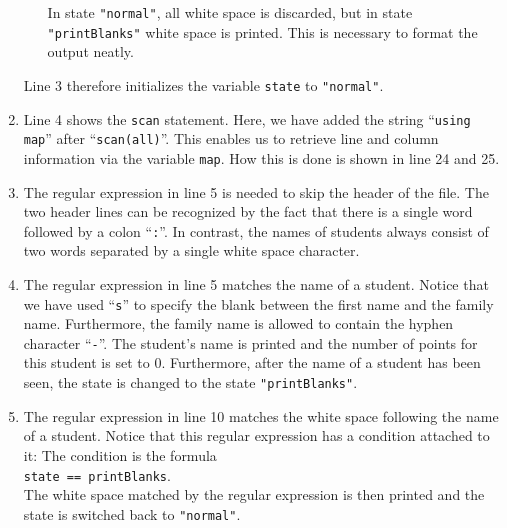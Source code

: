 \begin{enumerate}
\begin{enumerate}
            In state \texttt{"normal"}, all white space is discarded, but in state
            \texttt{"printBlanks"} white space is printed.  This is necessary to format
            the output neatly.
      \end{enumerate}
      Line 3 therefore initializes the variable \texttt{state} to \texttt{"normal"}.
\item Line 4 shows the \texttt{scan} statement.  Here, we have added the string ``\texttt{using map}'' 
      after ``\texttt{scan(all)}''.  This enables us to retrieve line and column information via the
      variable \texttt{map}.  How this is done is shown in line 24 and 25.
\item The regular expression in line 5 is needed to skip the header of the file.  The
      two header lines can be recognized by the fact that there is a single word followed by a colon
      ``\texttt{:}''.   In contrast, the names of students always consist of two words separated by
      a single white space character.
\item The regular expression in line 5 matches the name of a student.  Notice that we have used 
      ``\texttt{s}'' to specify the blank between the first name and the family name.
      Furthermore, the family name is allowed to contain the hyphen character ``\texttt{-}''.
      The student's name is printed and the number of points for this student is set to $0$.
      Furthermore, after the name of a student has been seen, the state is changed to the state
      \texttt{"printBlanks"}.
\item The regular expression in line 10 matches the white space following the name of a
      student.  Notice that this regular expression has a condition attached to it: 
      The condition is the formula
      \\[0.2cm]
      \hspace*{1.3cm}
      \texttt{state == printBlanks}.
      \\[0.2cm]
      The white space matched by the regular expression is then printed and the state is switched back to
      \texttt{"normal"}.


\end{enumerate}
